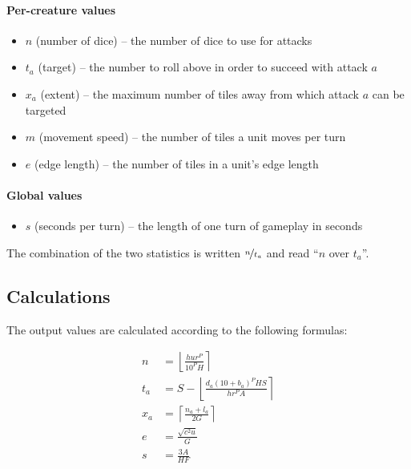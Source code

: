 \paragraph{Per-creature values}
\begin{itemize}
    \item $n$ (number of dice) -- the number of dice to use for attacks
    \item $t_a$ (target) -- the number to roll above in order to succeed with attack $a$
    \item $x_a$ (extent) -- the maximum number of tiles away from which attack $a$ can be targeted
    \item $m$ (movement speed) -- the number of tiles a unit moves per turn
    \item $e$ (edge length) -- the number of tiles in a unit's edge length
\end{itemize}

\paragraph{Global values}
\begin{itemize}
    \item $s$ (seconds per turn) -- the length of one turn of gameplay in seconds
\end{itemize}


The combination of the two statistics is written $\nicefrac{n}{t_a}$
and read ``$n$ over $t_a$''.

\subsection{Calculations}

The output values are calculated according to the following formulas:

\begin{align*}
    n   &=
        \left\lfloor
            \frac
                {h u r^P}
                {10^P H}
        \right\rceil \\[2ex]
    t_a &=
        S -
        \left\lfloor
            \frac
                {d_a (10 + b_{a})^P H S}
                {h r^P A}
        \right\rceil \\[2ex]
    x_a &= \left\lceil\frac
        {n_a + l_a}
        {2 G}
        \right\rceil \\[2ex]
    e   &=
        \frac
            {\sqrt{c^2 u}}
            {G} \\[2ex]
    s   &=
        \frac
            {3 A}
            {H F}
\end{align*}

